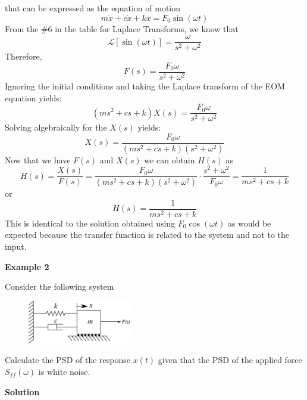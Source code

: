 \documentclass[12pt,a4paper]{article}
\newcommand{\Laplace}[1]{\ensuremath{\mathcal{L}{\left[#1\right]}}}
\begin{document}
that can be expressed as the equation of motion
\begin{equation}
	m\ddot{x} + c\dot{x} +kx = F_0 \sin(\omega t)
\end{equation}
From the \#6 in the table for Laplace Transforms, we know that
\begin{equation}
	\Laplace{\sin(\omega t)} = \frac{\omega}{s^2+\omega^2}
\end{equation}
Therefore, 
\begin{equation}
F(s) = \frac{F_0\omega}{s^2+\omega^2}
\end{equation}
Ignoring the initial conditions and taking the Laplace transform of the EOM equation yields:
\begin{equation}
(ms^2 + cs +k)X(s) = \frac{F_0 \omega}{s^2+\omega^2} 
\end{equation}
Solving algebraically for the $X(s)$ yields: 
\begin{equation}
X(s) = \frac{F_0\omega}{(ms^2 + cs +k)(s^2+\omega^2)}
\end{equation}
Now that we have $F(s)$ and $X(s)$ we can obtain $H(s)$ as  
\begin{equation}
H(s) = \frac{X(s)}{F(s)} = \frac{F_0 \omega }{(ms^2 + cs +k)(s^2+\omega^2)} \cdot \frac{s^2+\omega^2}{F_0 \omega} = \frac{1}{ms^2+cs+k}
\end{equation}
or 
\begin{equation}
H(s) = \frac{1}{ms^2+cs+k}
\end{equation}
This is identical to the solution obtained using $F_0 \cos(\omega t)$ as would be expected because the transfer function is related to the system and not to the input. 

\textbf{Example 2}

Consider the following system

\begin{figure}[H]
	\centering
	\includegraphics[width=0.4\textwidth]{../../Figures/forced_spring_mass_damper_system.png}
\end{figure}

Calculate the PSD of the response $x(t)$ given that the PSD of the applied force $S_{ff}(\omega)$ is white noise. 

\textbf{Solution}
\end{document}
